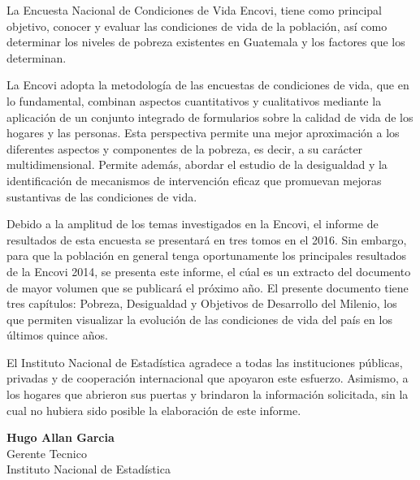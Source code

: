 La Encuesta Nacional de Condiciones de Vida \textemdash Encovi\textemdash, tiene como principal objetivo, conocer y evaluar las condiciones de vida de la población, así como determinar los niveles de pobreza existentes en Guatemala y los factores que los determinan.
 
 La Encovi adopta la metodología de las encuestas de condiciones de vida, que en lo fundamental, combinan aspectos cuantitativos y cualitativos mediante la aplicación de un conjunto integrado de formularios sobre la calidad de vida de los hogares y las personas. Esta perspectiva permite una mejor aproximación a los diferentes aspectos y componentes de la pobreza, es decir, a su carácter multidimensional. Permite además, abordar el estudio de la desigualdad y la identificación de mecanismos de intervención eficaz que promuevan mejoras sustantivas de las condiciones de vida.

Debido a la amplitud de los temas investigados en la Encovi, el informe de resultados de esta encuesta se presentará en tres tomos en el 2016. Sin embargo, para que la población en general tenga oportunamente    los principales resultados de la Encovi 2014, se presenta este informe, el cúal es un extracto del documento de mayor volumen que se publicará el próximo año.  El presente documento tiene tres capítulos: Pobreza, Desigualdad y Objetivos de Desarrollo del Milenio, los que permiten visualizar la evolución de las condiciones de vida del país en los últimos quince años. 


El Instituto Nacional de Estadística agradece a todas las instituciones públicas, privadas y de cooperación internacional que apoyaron este esfuerzo. Asimismo, a los hogares que abrieron sus puertas y  brindaron  la información  solicitada, sin la cual no hubiera sido posible  la elaboración de este informe.\\[1cm] 

\begin{center}
\textbf{Hugo Allan Garcia}\\
Gerente Tecnico\\
Instituto Nacional de Estadística
\end{center}